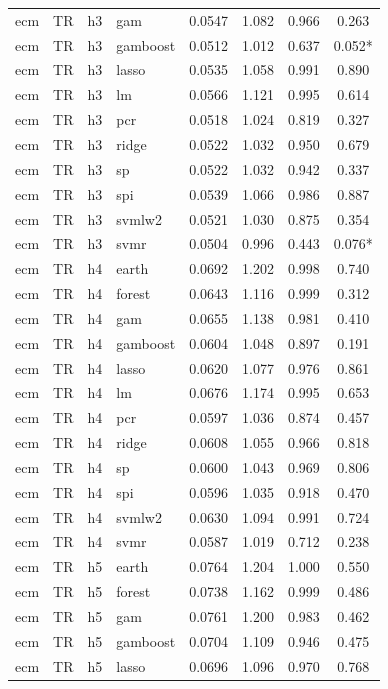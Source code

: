 \begin{ThreePartTable}
\begin{longtable}[t]{llclcccc}
ecm & TR & h3 & gam & 0.0547 & 1.082 & 0.966 & 0.263\\
ecm & TR & h3 & gamboost & 0.0512 & 1.012 & 0.637 & 0.052*\\
ecm & TR & h3 & lasso & 0.0535 & 1.058 & 0.991 & 0.890\\
ecm & TR & h3 & lm & 0.0566 & 1.121 & 0.995 & 0.614\\
ecm & TR & h3 & pcr & 0.0518 & 1.024 & 0.819 & 0.327\\
ecm & TR & h3 & ridge & 0.0522 & 1.032 & 0.950 & 0.679\\
ecm & TR & h3 & sp & 0.0522 & 1.032 & 0.942 & 0.337\\
ecm & TR & h3 & spi & 0.0539 & 1.066 & 0.986 & 0.887\\
ecm & TR & h3 & svmlw2 & 0.0521 & 1.030 & 0.875 & 0.354\\
ecm & TR & h3 & svmr & 0.0504 & 0.996 & 0.443 & 0.076*\\
\addlinespace
ecm & TR & h4 & earth & 0.0692 & 1.202 & 0.998 & 0.740\\
ecm & TR & h4 & forest & 0.0643 & 1.116 & 0.999 & 0.312\\
ecm & TR & h4 & gam & 0.0655 & 1.138 & 0.981 & 0.410\\
ecm & TR & h4 & gamboost & 0.0604 & 1.048 & 0.897 & 0.191\\
ecm & TR & h4 & lasso & 0.0620 & 1.077 & 0.976 & 0.861\\
ecm & TR & h4 & lm & 0.0676 & 1.174 & 0.995 & 0.653\\
ecm & TR & h4 & pcr & 0.0597 & 1.036 & 0.874 & 0.457\\
ecm & TR & h4 & ridge & 0.0608 & 1.055 & 0.966 & 0.818\\
ecm & TR & h4 & sp & 0.0600 & 1.043 & 0.969 & 0.806\\
ecm & TR & h4 & spi & 0.0596 & 1.035 & 0.918 & 0.470\\
ecm & TR & h4 & svmlw2 & 0.0630 & 1.094 & 0.991 & 0.724\\
ecm & TR & h4 & svmr & 0.0587 & 1.019 & 0.712 & 0.238\\
\addlinespace
ecm & TR & h5 & earth & 0.0764 & 1.204 & 1.000 & 0.550\\
ecm & TR & h5 & forest & 0.0738 & 1.162 & 0.999 & 0.486\\
ecm & TR & h5 & gam & 0.0761 & 1.200 & 0.983 & 0.462\\
ecm & TR & h5 & gamboost & 0.0704 & 1.109 & 0.946 & 0.475\\
ecm & TR & h5 & lasso & 0.0696 & 1.096 & 0.970 & 0.768\\

\end{longtable}
\end{ThreePartTable}
